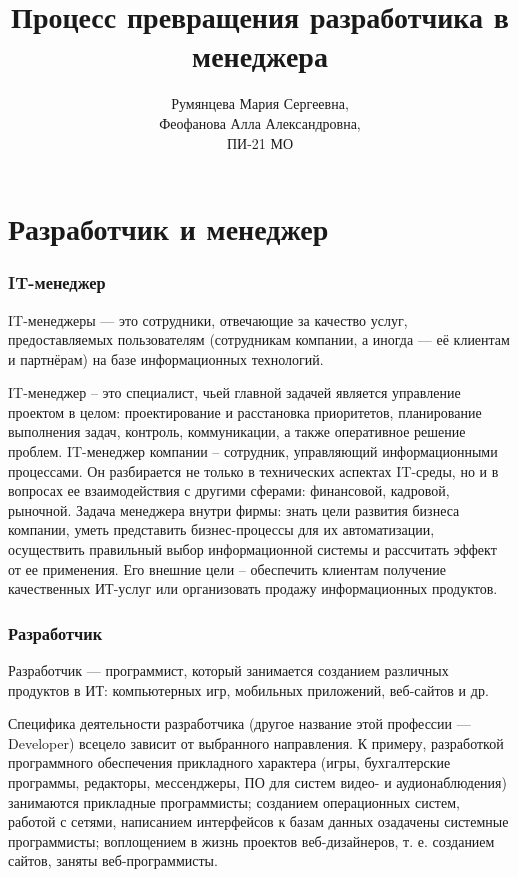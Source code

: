 \documentclass{../industrial-development}
\title{Процесс превращения разработчика в менеджера}
\author{Румянцева Мария Сергеевна, \\Феофанова Алла Александровна, \\ПИ-21 МО}
\date{}
\begin{document}
\begin{frame}
  \titlepage
\end{frame}

\section{Разработчик и менеджер}

\begin{frame} \frametitle{IT-менеджер}
	IT-менеджеры — это сотрудники, отвечающие за качество услуг, предоставляемых пользователям (сотрудникам компании, а иногда — её клиентам и партнёрам) на базе информационных технологий.
\end{frame}
\lecturenotes
IT-менеджер – это специалист, чьей главной задачей является управление проектом в целом: проектирование и расстановка приоритетов, планирование выполнения задач, контроль, коммуникации, а также оперативное решение проблем.
IT-менеджер компании – сотрудник, управляющий информационными процессами. Он разбирается не только в технических аспектах IT-среды, но и в вопросах ее взаимодействия с другими сферами: финансовой, кадровой, рыночной.  Задача менеджера внутри фирмы: знать цели развития бизнеса компании, уметь представить бизнес-процессы для их автоматизации, осуществить правильный выбор информационной системы и рассчитать эффект от ее применения.  Его внешние цели – обеспечить клиентам получение качественных ИТ-услуг или организовать продажу информационных продуктов.
~\cite{How_to_be_a_good_IT-manager}

\begin{frame} \frametitle{Разработчик}
Разработчик — программист, который занимается созданием различных продуктов в ИТ: компьютерных игр, мобильных приложений, веб-сайтов и др. 
\end{frame}
\lecturenotes
Специфика деятельности разработчика (другое название этой профессии — Developer) всецело зависит от выбранного направления. К примеру, разработкой программного обеспечения прикладного характера (игры‚ бухгалтерские программы‚ редакторы‚ мессенджеры, ПО для систем видео- и аудионаблюдения) занимаются прикладные программисты; созданием операционных систем, работой с сетями, написанием интерфейсов к базам данных озадачены системные программисты; воплощением в жизнь проектов веб-дизайнеров, т. е. созданием сайтов, заняты веб-программисты.
~\cite{How_to_be_a_good_IT-manager}
\end{document}
